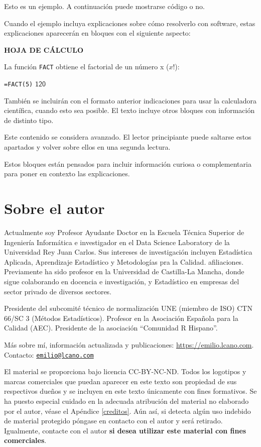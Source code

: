\documentclass[
]{book}
\theoremstyle{definition}
\theoremstyle{definition}
\theoremstyle{definition}
\theoremstyle{definition}
\theoremstyle{remark}
\begin{document}
Esto es un ejemplo. A continuación puede mostrarse código o no.

Cuando el ejemplo incluya explicaciones sobre cómo resolverlo con software,
estas explicaciones aparecerán en bloques con el siguiente aspecto:

\textbf{HOJA DE CÁLCULO}

La función \texttt{FACT} obtiene el factorial de un número x (\(x!\)):

\texttt{=FACT(5)}
\(\boxed{\mathsf{120}}\)

También se incluirán con el formato anterior indicaciones para usar la calculadora
científica, cuando esto sea posible.
El texto incluye otros bloques con información de distinto tipo.

Este contenido se considera avanzado. El lector principiante puede saltarse estos apartados
y volver sobre ellos en una segunda lectura.

Estos bloques están pensados para incluir información curiosa o complementaria
para poner en contexto las explicaciones.

\hypertarget{sobre-el-autor}{%
\section*{Sobre el autor}\label{sobre-el-autor}}

Actualmente soy Profesor Ayudante Doctor en la Escuela Técnica Superior de Ingeniería Informática e investigador en el Data Science Laboratory de la Universidad Rey Juan Carlos. Sus intereses de investigación incluyen Estadística Aplicada, Aprendizaje Estadístico y Metodologías pra la Calidad. afiliaciones. Previamente ha sido profesor en la Universidad de Castilla-La Mancha, donde sigue colaborando en docencia e investigación, y Estadístico en empresas del sector privado de diversos sectores.

Presidente del subcomité técnico de normalización UNE (miembro de ISO) CTN 66/SC 3 (Métodos Estadísticos). Profesor en la Asociación Española para la Calidad (AEC). Presidente de la asociación ``Comunidad R Hispano''.

Más sobre mí, información actualizada y publicaciones: \url{https://emilio.lcano.com}.\\
Contacto: \href{mailto:emilio@lcano.com}{\nolinkurl{emilio@lcano.com}}

El material se proporciona bajo licencia CC-BY-NC-ND.
Todos los logotipos y marcas comerciales que puedan aparecer en este texto
son propiedad de sus respectivos dueños y se incluyen en este texto únicamente
con fines formativos. Se ha puesto especial cuidado en la adecuada atribución
del material no elaborado por el autor, véase el Apéndice \ref{creditos}.
Aún así, si detecta algún uso
indebido de material protegido póngase en contacto con el autor y será retirado.
Igualmente, contacte con el autor \textbf{si desea utilizar este material con fines
comerciales}.
\end{document}
